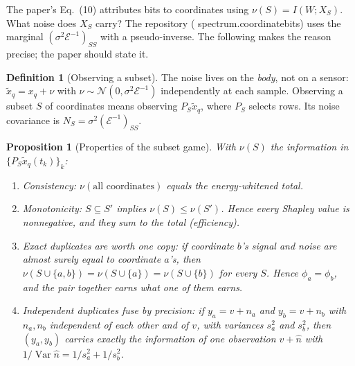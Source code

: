 \documentclass[11pt]{article}
\newtheorem{proposition}[theorem]{Proposition}
\theoremstyle{definition}
\newtheorem{definition}[theorem]{Definition}
\theoremstyle{remark}
\newcommand{\Var}{\operatorname{Var}}
\newcommand{\Em}{\mathcal{E}}         %
\newcommand{\codeus}{\textunderscore\allowbreak}
\newcommand{\code}[1]{{\ttfamily\let\_\codeus\hyphenchar\font=-1 #1}}
\begin{document}
The paper's Eq.~(10) attributes bits to coordinates using
$\nu(S)=I(W;X_S)$. What noise does $X_S$ carry? The repository
(\code{spectrum.coordinate\_bits}) uses the marginal $(\sigma^2\Em^{-1})_{SS}$ with a
pseudo-inverse. The following makes the reason precise; the paper should state it.

\begin{definition}[Observing a subset]\label{def:subset}
The noise lives on the \emph{body}, not on a sensor: $\tilde x_q=x_q+\nu$ with
$\nu\sim\mathcal N(0,\sigma^2\Em^{-1})$ independently at each sample. Observing a subset
$S$ of coordinates means observing $P_S\tilde x_q$, where $P_S$ selects rows. Its noise
covariance is $N_S=\sigma^2(\Em^{-1})_{SS}$.
\end{definition}

\begin{proposition}[Properties of the subset game]\label{prop:subset}
With $\nu(S)$ the information in $\{P_S\tilde x_q(t_k)\}_k$:
\begin{enumerate}[label=(\alph*)]
  \item \emph{Consistency:} $\nu(\text{all coordinates})$ equals the energy-whitened total.
  \item \emph{Monotonicity:} $S\subseteq S'$ implies $\nu(S)\le\nu(S')$. Hence every
        Shapley value is nonnegative, and they sum to the total (efficiency).
  \item \emph{Exact duplicates are worth one copy:} if coordinate $b$'s signal \emph{and}
        noise are almost surely equal to coordinate $a$'s, then $\nu(S\cup\{a,b\})=
        \nu(S\cup\{a\})=\nu(S\cup\{b\})$ for every $S$. Hence $\phi_a=\phi_b$, and the
        pair together earns what one of them earns.
  \item \emph{Independent duplicates fuse by precision:} if $y_a=v+n_a$ and $y_b=v+n_b$
        with $n_a,n_b$ independent of each other and of $v$, with variances $s_a^2$ and
        $s_b^2$, then $(y_a,y_b)$ carries exactly the information of one observation
        $v+\hat n$ with $1/\Var\hat n=1/s_a^2+1/s_b^2$.
\end{enumerate}
\end{proposition}
\end{document}
